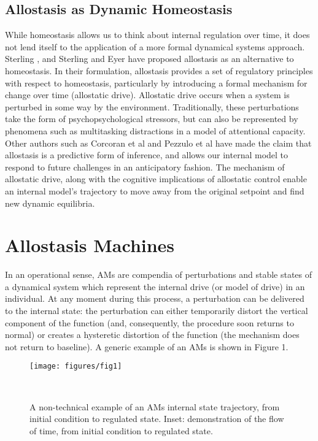 \documentclass{sigchi}
\begin{document}
\subsection{Allostasis as Dynamic Homeostasis}
While homeostasis allows us to think about internal regulation over time, it does not lend itself to the application of a more formal dynamical systems approach. Sterling \cite{sterling}, \cite{sterling:allostasis} and Sterling and Eyer \cite{fisher:newparadigm} have proposed allostasis as an alternative to homeostasis. In their formulation, allostasis provides a set of regulatory principles with respect to homeostasis, particularly by introducing a formal mechanism for change over time (allostatic drive). Allostatic drive occurs when a system is perturbed in some way by the environment. Traditionally, these perturbations take the form of psychopsychological stressors, but can also be represented by phenomena such as multitasking distractions in a model of attentional capacity. Other authors such as Corcoran et al \cite{corcoran} and Pezzulo et al \cite{pezzulo} have made the claim that allostasis is a predictive form of inference, and allows our internal model to respond to future challenges in an anticipatory fashion. The mechanism of allostatic drive, along with the cognitive implications of allostatic control enable an internal model’s trajectory to move away from the original setpoint and find new dynamic equilibria.


\section{Allostasis Machines}
In an operational sense, AMs are compendia of perturbations and stable states of a dynamical system  which represent the internal drive (or model of drive) in an individual. At any moment during this process, a perturbation can be delivered to the internal state: the perturbation can either temporarily distort the vertical component of the function (and, consequently, the procedure soon returns to normal) or creates a hysteretic distortion of the function (the mechanism does not return to baseline). A generic example of an AMs is shown in Figure 1. \\
\begin{figure}[h]
\centering
  \texttt{[image: figures/fig1]}
  \caption{A non-technical example of an AMs internal state trajectory, from initial condition to regulated state. Inset: demonstration of the flow of time, from initial condition to regulated state. }~\label{fig:figure1}
\end{figure}
\end{document}
